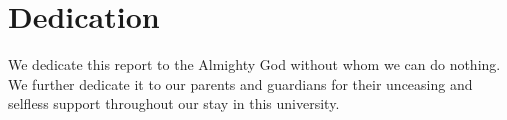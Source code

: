 \cleardoublepage
{}
\chapter*{Dedication}
We dedicate this report to the Almighty God without whom we can do nothing.
We further dedicate it to our parents and guardians for their unceasing and selfless support throughout our stay in this university.
\newpage
